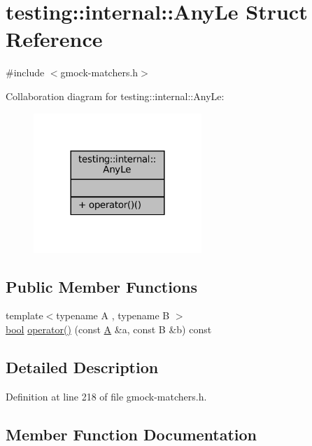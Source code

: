 \hypertarget{structtesting_1_1internal_1_1AnyLe}{}\section{testing\+:\+:internal\+:\+:Any\+Le Struct Reference}
\label{structtesting_1_1internal_1_1AnyLe}


{\ttfamily \#include $<$gmock-\/matchers.\+h$>$}



Collaboration diagram for testing\+:\+:internal\+:\+:Any\+Le\+:
\nopagebreak
\begin{figure}[H]
\begin{center}
\leavevmode
\includegraphics[width=180pt]{structtesting_1_1internal_1_1AnyLe__coll__graph}
\end{center}
\end{figure}
\subsection*{Public Member Functions}
\begin{DoxyCompactItemize}
\item 
{\footnotesize template$<$typename A , typename B $>$ }\\\hyperlink{classbool}{bool} \hyperlink{structtesting_1_1internal_1_1AnyLe_aadb369f2ea23ba9889b06df4c8bc1b82}{operator()} (const \hyperlink{namespacetesting_a5e9134d655d2fc9323902348083282e7}{A} \&a, const B \&b) const
\end{DoxyCompactItemize}


\subsection{Detailed Description}


Definition at line 218 of file gmock-\/matchers.\+h.



\subsection{Member Function Documentation}
\mbox{\label{structtesting_1_1internal_1_1AnyLe_aadb369f2ea23ba9889b06df4c8bc1b82}} 
